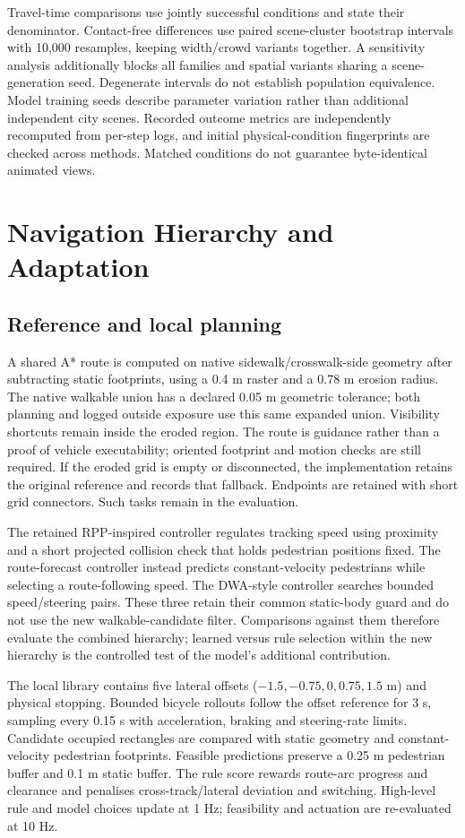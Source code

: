 \documentclass[10pt,a4paper]{article}
\begin{document}
Travel-time comparisons use jointly successful conditions and state their denominator. Contact-free differences use paired scene-cluster bootstrap intervals with 10,000 resamples, keeping width/crowd variants together. A sensitivity analysis additionally blocks all families and spatial variants sharing a scene-generation seed. Degenerate intervals do not establish population equivalence. Model training seeds describe parameter variation rather than additional independent city scenes. Recorded outcome metrics are independently recomputed from per-step logs, and initial physical-condition fingerprints are checked across methods. Matched conditions do not guarantee byte-identical animated views.

\section{Navigation Hierarchy and Adaptation}
\subsection{Reference and local planning}
A shared A* route is computed on native sidewalk/crosswalk-side geometry after subtracting static footprints, using a 0.4 m raster and a 0.78 m erosion radius. The native walkable union has a declared 0.05 m geometric tolerance; both planning and logged outside exposure use this same expanded union. Visibility shortcuts remain inside the eroded region. The route is guidance rather than a proof of vehicle executability; oriented footprint and motion checks are still required.
If the eroded grid is empty or disconnected, the implementation retains the original reference and records that fallback. Endpoints are retained with short grid connectors. Such tasks remain in the evaluation.

The retained RPP-inspired controller regulates tracking speed using proximity and a short projected collision check that holds pedestrian positions fixed. The route-forecast controller instead predicts constant-velocity pedestrians while selecting a route-following speed. The DWA-style controller searches bounded speed/steering pairs. These three retain their common static-body guard and do not use the new walkable-candidate filter. Comparisons against them therefore evaluate the combined hierarchy; learned versus rule selection within the new hierarchy is the controlled test of the model's additional contribution.

The local library contains five lateral offsets ($-1.5,-0.75,0,0.75,1.5$ m) and physical stopping. Bounded bicycle rollouts follow the offset reference for 3 s, sampling every 0.15 s with acceleration, braking and steering-rate limits. Candidate occupied rectangles are compared with static geometry and constant-velocity pedestrian footprints. Feasible predictions preserve a 0.25 m pedestrian buffer and 0.1 m static buffer. The rule score rewards route-arc progress and clearance and penalises cross-track/lateral deviation and switching. High-level rule and model choices update at 1 Hz; feasibility and actuation are re-evaluated at 10 Hz.
\end{document}
